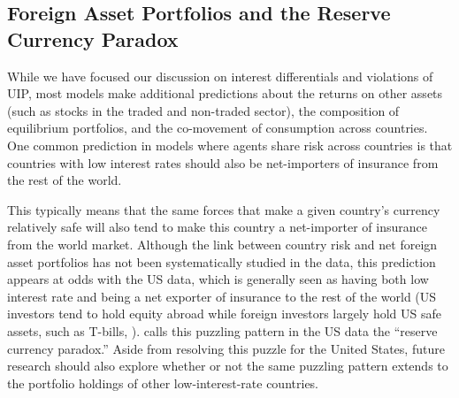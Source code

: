 \documentclass{ar-1col}
\begin{document}
 
\begin{textbox}[h]
\section{Foreign Asset Portfolios and the Reserve Currency Paradox} While we have focused our discussion on interest differentials and violations of UIP, most models make additional predictions about the returns on other assets (such as stocks in the traded and non-traded sector), the composition of equilibrium portfolios, and the co-movement of consumption across countries. One common prediction in models where agents share risk across countries is that countries with low interest rates should also be net-importers of insurance from the rest of the world. 


This typically means that the same forces that make a given country's currency relatively safe will also tend to make this country a net-importer of insurance from the world market. Although the link between country risk and net foreign asset portfolios has not been systematically studied in the data, this prediction appears at odds with the US data, which is generally seen as having both low interest rate and being a net exporter of insurance to the rest of the world (US investors tend to hold equity abroad while foreign investors largely hold US safe assets, such as T-bills, \citep{GourinchasRey2007,GourinchasGovillotRey2017}). \cite{Maggiori2013} calls this puzzling pattern in the US data the ``reserve currency paradox.'' Aside from resolving this puzzle for the United States, future research should also explore whether or not the same puzzling pattern extends to the portfolio holdings of other low-interest-rate countries. 
\end{textbox}
\end{document}
